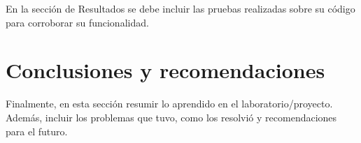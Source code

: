 \documentclass[12pt,letterpaper]{article}
\begin{document}
En la sección de Resultados se debe incluir las pruebas realizadas sobre su código para corroborar su funcionalidad.


\section{Conclusiones y recomendaciones}

Finalmente, en esta sección resumir lo aprendido en el laboratorio/proyecto. Además, incluir los problemas que tuvo, como los resolvió y recomendaciones para el futuro.

\newpage
\clearpage




\end{document}
